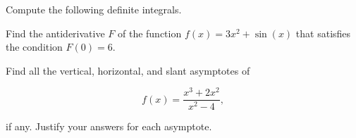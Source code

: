 \documentclass[addpoints,12pt]{exam}
\begin{document}
\begin{questions}




\question Compute the following definite integrals.


\newpage


\vfill

\question[6] Find the antiderivative $F$ of the function $f(x) = 3x^2+ \sin(x)$ that satisfies the
condition $F(0) = 6.$

\vfill

\newpage

\question[8] Find all the vertical, horizontal, and slant asymptotes of

$$f(x) = \dfrac{x^3 + 2x^2}{x^2-4},$$

if any. Justify your answers for each asymptote.










\end{questions}
\end{document}
